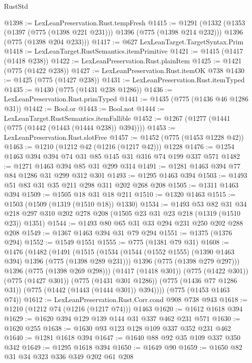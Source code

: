 \begin{lexlean}{RustStd}
\begin{coremodule}
@1398 := LexLeanPreservation.Rust.tempFresh
@1415 := @1291
    (@1332
      (@1353 (@1397 (@775 (@1398 @221 @231))) @1396 (@775 (@1398 @214 @232)))
      @1396
      (@775 (@1398 @204 @233)))
@1417 := @627 LexLeanTarget.TargetSyntax.Prim
@1418 := LexLeanTarget.RustSemantics.itemPrimitive
@1421 := @1415 (@1417 (@1418 @238))
@1422 := LexLeanPreservation.Rust.plainItem
@1425 := @1421 (@775 (@1422 @238))
@1427 := LexLeanPreservation.Rust.itemOK @738
@1430 := @1425 (@775 (@1427 @238))
@1431 := LexLeanPreservation.Rust.itemTyped
@1435 := @1430 (@775 (@1431 @238 @1286))
@1436 := LexLeanPreservation.Rust.primTyped
@1441 := @1435 (@775 (@1436 @46 @1286 @31))
@1442 := Bool.or
@1443 := Bool.not
@1444 := LexLeanTarget.RustSemantics.itemFallible
@1452 := @1267 (@1277 (@1441 (@775 (@1442 (@1443 (@1444 @238)) @394))))
@1453 := LexLeanPreservation.Rust.slotFree
@1457 := @1452 (@775 (@1453 @1228 @42))
@1463 := @1210 (@1212 @42 (@1216 (@1217 @42))) @1228
@1476 := @1254 @1463 @394 @394 @74 @31 @85 @145 @31 @316 @74 @199 @337 @571
@1482 := @1271 @1463 @394 @85 @31 @299 @314
@1491 := @1281 @1463 @394 @77 @84 @1286 @31 @299 @312 @301
@1493 := @1295 @1463 @394
@1503 := @1493 @51 @83 @31 @35 @211 @298 @311 @202 @268 @208
@1505 := @1311 @1463 @394
@1509 := @1505 @18 @31 @18 @211
@1510 := @1320 @1463
@1515 := @1503 (@1509 (@1319 (@1510 @18)) @1330)
@1534 := @1493
    @53
    @82
    @31
    @34
    @218
    @297
    @310
    @202
    @278
    @208
    (@1505 @23 @31 @23 @218 (@1319 (@1510 @23)) @1351)
@1544 := @1493 @80 @65 @31 @33 @294 @231 @250 @202 @288 @208
@1549 := @1367 @1463 @394 @31 @79 @294
@1551 := @1375 (@1376 @294)
@1552 := @1549 @1551
@1555 := @775 (@1381 @79 @31)
@1608 := @1476
    (@1482
      (@1491
        (@1515
          (@1534
            (@1544 (@1552 @1555) (@1390 @1463 @394) @1396 (@775 (@1398 @289 @231)))
            @1396
            (@775 (@1398 @279 @297)))
          @1396
          (@775 (@1398 @269 @298)))
        (@1417 (@1418 @301))
        (@775 (@1422 @301))
        (@775 (@1427 @301))
        (@775 (@1431 @301 @1286))
        (@775 (@1436 @77 @1286 @31))
        (@775 (@1442 (@1443 (@1444 @301)) @394))))
    (@775 (@1453 @1463 @74))
@1612 := LexLeanPreservation.Rust.Corr.cond @908 @738 @943
@1618 := @1210 (@1212 @74 (@1216 (@1217 @74))) @1463
@1620 := @1612 @1618 @394
@1629 := @1620 @394 @129 @139 @144 @31 @337 @462 @231 @571
@1630 := @1620 @255
@1638 := @1630 @93 @123 @128 @109 @337 @352 @231 @462
@1640 := @1281 @1618 @394
@1647 := @1640 @88 @92 @35 @109 @337 @350 @342
@1649 := @1295 @1618 @394
@1650 := @1649 @90
@1659 := @1650 @82 @31 @34 @323 @336 @349 @202 @61 @208

\end{coremodule}
\end{lexlean}

